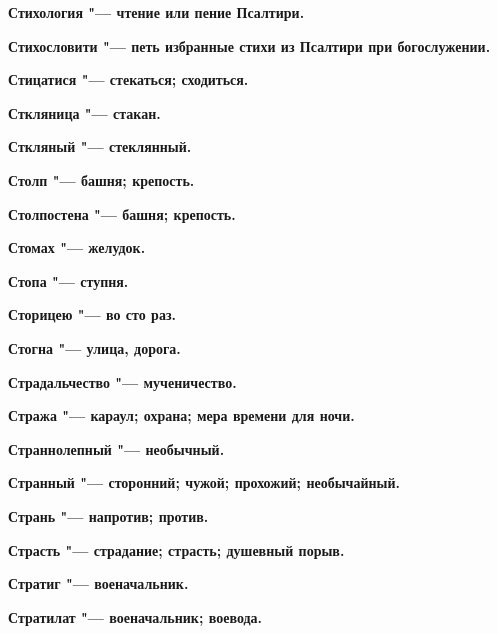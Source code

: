 \begin{multicols}{2}
\bfseries Стихология\normalfont{} "--- чтение или пение Псалтири. 




\bfseries Стихословити\normalfont{} "--- петь избранные стихи из Псалтири при богослужении. 




\bfseries Стицатися\normalfont{} "--- стекаться; сходиться. 




\bfseries Сткляница\normalfont{} "--- стакан. 




\bfseries Сткляный\normalfont{} "--- стеклянный. 




\bfseries Столп\normalfont{} "--- башня; крепость. 




\bfseries Столпостена\normalfont{} "--- башня; крепость. 




\bfseries Стомах\normalfont{} "--- желудок. 




\bfseries Стопа\normalfont{} "--- ступня. 




\bfseries Сторицею\normalfont{} "--- во сто раз. 




\bfseries Стогна\normalfont{} "--- улица, дорога. 




\bfseries Страдальчество\normalfont{} "--- мученичество. 




\bfseries Стража\normalfont{} "--- караул; охрана; мера времени для ночи. 




\bfseries Страннолепный\normalfont{} "--- необычный. 




\bfseries Странный\normalfont{} "--- сторонний; чужой; прохожий; необычайный. 




\bfseries Странь\normalfont{} "--- напротив; против. 




\bfseries Страсть\normalfont{} "--- страдание; страсть; душевный порыв. 




\bfseries Стратиг\normalfont{} "--- военачальник. 




\bfseries Стратилат\normalfont{} "--- военачальник; воевода. 





\end{multicols}

